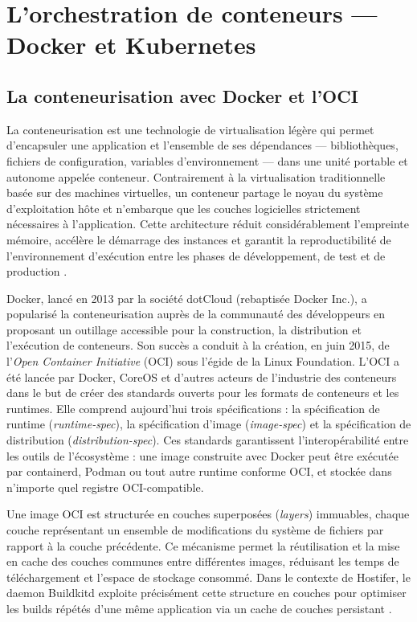 \section{L'orchestration de conteneurs — Docker et Kubernetes}

\subsection{La conteneurisation avec Docker et l'OCI}

La conteneurisation est une technologie de virtualisation légère qui permet d'encapsuler une application et l'ensemble de ses dépendances — bibliothèques, fichiers de configuration, variables d'environnement — dans une unité portable et autonome appelée conteneur. Contrairement à la virtualisation traditionnelle basée sur des machines virtuelles, un conteneur partage le noyau du système d'exploitation hôte et n'embarque que les couches logicielles strictement nécessaires à l'application. Cette architecture réduit considérablement l'empreinte mémoire, accélère le démarrage des instances et garantit la reproductibilité de l'environnement d'exécution entre les phases de développement, de test et de production \cite{docker-docs}.

Docker, lancé en 2013 par la société dotCloud (rebaptisée Docker Inc.), a popularisé la conteneurisation auprès de la communauté des développeurs en proposant un outillage accessible pour la construction, la distribution et l'exécution de conteneurs. Son succès a conduit à la création, en juin 2015, de l'\textit{Open Container Initiative} (OCI) sous l'égide de la Linux Foundation. L'OCI a été lancée par Docker, CoreOS et d'autres acteurs de l'industrie des conteneurs dans le but de créer des standards ouverts pour les formats de conteneurs et les runtimes. Elle comprend aujourd'hui trois spécifications : la spécification de runtime (\textit{runtime-spec}), la spécification d'image (\textit{image-spec}) et la spécification de distribution (\textit{distribution-spec}).  Ces standards garantissent l'interopérabilité entre les outils de l'écosystème : une image construite avec Docker peut être exécutée par containerd, Podman ou tout autre runtime conforme OCI, et stockée dans n'importe quel registre OCI-compatible.

Une image OCI est structurée en couches superposées (\textit{layers}) immuables, chaque couche représentant un ensemble de modifications du système de fichiers par rapport à la couche précédente. Ce mécanisme permet la réutilisation et la mise en cache des couches communes entre différentes images, réduisant les temps de téléchargement et l'espace de stockage consommé. Dans le contexte de Hostifer, le daemon Buildkitd exploite précisément cette structure en couches pour optimiser les builds répétés d'une même application via un cache de couches persistant \cite{buildkit-client}.


